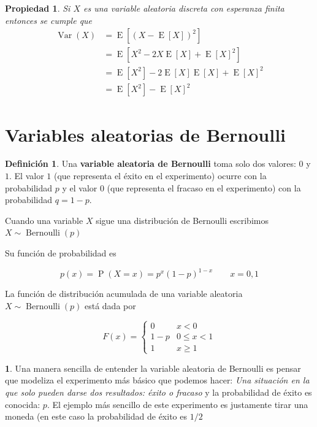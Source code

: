 \documentclass[]{book}
\theoremstyle{plain}
\newtheorem{property}[theorem]{Propiedad}
\theoremstyle{definition}
\newtheorem{definition}[theorem]{Definición}
\theoremstyle{definition} %
\newcommand{\thistheoremname}{}
\newtheorem{genericthm}[theorem]{\thistheoremname}
\newenvironment{customdef}[1]
  {\renewcommand{\thistheoremname}{#1}%
   \begin{genericthm}}
  {\end{genericthm}}
\begin{document}
\begin{property}
  Si $X$ es una variable aleatoria discreta con esperanza finita entonces se cumple que 
   \[
    \begin{aligned}\operatorname {Var} (X)&=\operatorname {E} 
      \left[(X-\operatorname {E} [X])^{2}\right]\\[4pt]&=\operatorname {E} 
      \left[X^{2}-2X\operatorname {E} [X]+\operatorname {E} [X]^{2}\right]\\[4pt]
      &=\operatorname {E} \left[X^{2}\right]-2\operatorname {E} [X]\operatorname {E} [X]+
      \operatorname {E} [X]^{2}\\[4pt]&=\operatorname {E} \left[X^{2}\right]-\operatorname {E} [X]^{2}\end{aligned}
 \]
\end{property}

\section{Variables aleatorias de
Bernoulli}

\begin{definition}
  Una \textbf{variable aleatoria de Bernoulli} toma solo dos valores:
\(0\) y \(1\). El valor \(1\) (que representa el éxito en el
experimento) ocurre con la probabilidad \(p\) y el valor \(0\) (que
representa el fracaso en el experimento) con la probabilidad
\(q = 1 - p\).

Cuando una variable \(X\) sigue una distribución de Bernoulli escribimos
\(\displaystyle X\sim \operatorname {Bernoulli} (p)\)

Su función de probabilidad es

\[\displaystyle p(x)=\operatorname {P} (X=x)=p^{x}(1-p)^{1-x}\qquad x=0,1\]

La función de distribución acumulada de una variable aleatoria
\(\displaystyle X\sim \operatorname {Bernoulli} (p)\) está dada por

\[\displaystyle F(x)={\begin{cases}0&x<0\\1-p&0\leq x<1\\1&x\geq 1\end{cases}}\]
\end{definition}

\begin{customdef}{Experimento de Bernoulli}
  Una manera sencilla de entender la variable aleatoria de Bernoulli es pensar que modeliza el experimento más básico que 
  podemos hacer: \emph{Una situación en la que solo pueden darse dos resultados: éxito o fracaso} y la probabilidad de éxito es 
  conocida: $p$. El ejemplo más sencillo de este experimento es justamente tirar una moneda (en este caso la probabilidad de éxito es $1/2$
\end{customdef} 
\end{document}
